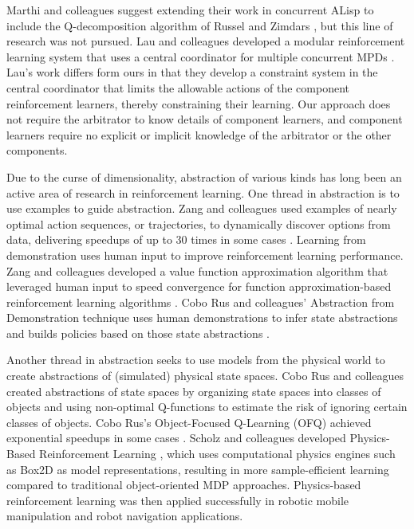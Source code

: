 Marthi and colleagues \cite{marthi2005concurrent} suggest extending their work in concurrent ALisp to include the Q-decomposition algorithm of Russel and Zimdars \cite{russell2003q-decomposition}, but this line of research was not pursued. Lau and colleagues developed a modular reinforcement learning system that uses a central coordinator for multiple concurrent MPDs \cite{lau2012coordination}. Lau's work differs form ours in that they develop a constraint system in the central coordinator that limits the allowable actions of the component reinforcement learners, thereby constraining their learning. Our approach does not require the arbitrator to know details of component learners, and component learners require no explicit or implicit knowledge of the arbitrator or the other components.

Due to the curse of dimensionality, abstraction of various kinds has long been an active area of research in reinforcement learning. One thread in abstraction is to use examples to guide abstraction. Zang and colleagues used examples of nearly optimal action sequences, or trajectories, to dynamically discover options from data, delivering speedups of up to 30 times in some cases \cite{zang2009discovering}. Learning from demonstration \cite{zang2010batch} uses human input to improve reinforcement learning performance. Zang and colleagues developed a value function approximation algorithm that leveraged human input to speed convergence for function approximation-based reinforcement learning algorithms \cite{zang2010using}. Cobo Rus and colleagues' Abstraction from Demonstration technique uses human demonstrations to infer state abstractions and builds policies based on those state abstractions \cite{cobo-rus2011automatic,cobo-rus2012automatic,cobo-rus2014abstraction}.

Another thread in abstraction seeks to use models from the physical world to create abstractions of (simulated) physical state spaces. Cobo Rus and colleagues created abstractions of state spaces by organizing state spaces into classes of objects and using non-optimal Q-functions to estimate the risk of ignoring certain classes of objects. Cobo Rus's Object-Focused Q-Learning (OFQ) achieved exponential speedups in some cases \cite{cobo-rus2013object}. Scholz and colleagues developed Physics-Based Reinforcement Learning \cite{scholz2014physics}, which uses computational physics engines such as Box2D \cite{catto2013box2d} as model representations, resulting in more sample-efficient learning compared to traditional object-oriented MDP approaches. Physics-based reinforcement learning was then applied successfully in robotic mobile manipulation \cite{scholz2015learning} and robot navigation \cite{scholz2016navigating} applications.


